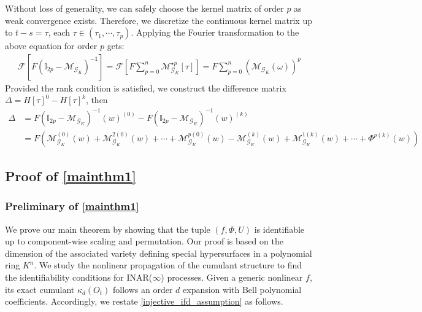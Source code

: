 \documentclass[10pt]{article}
\numberwithin{figure}{section}
\begin{document}
Without loss of generality, we can safely choose the kernel matrix of order $p$ as weak convergence exists. Therefore, we discretize the continuous kernel matrix up to $t-s=\tau$, each $\tau \in (\tau_1,\cdots,\tau_p)$. Applying the Fourier transformation to the above equation for order $p$ gets:
\begin{align}
    \mathcal{F}[F(\mathbb{I}_{2p}-\mathcal{M}_{\mathcal{G}_K})^{-1}]  = \mathcal{F}\left[ F\sum_{p=0}^{n}\mathcal{M}_{\mathcal{G}_K}^{\star p}[\tau]\right] =  F\sum_{p=0}^{n}\left(\mathcal{M}_{\mathcal{G}_K}(\omega)\right)^p
\end{align}
Provided the rank condition is satisfied, we construct the difference matrix $\Delta= H[\tau]^{0}-H[\tau]^{k}$, then
\begin{align*}
    \Delta &= F(\mathbb{I}_{2p} - \mathcal{M}_{\mathcal{G}_K})^{-1}(w)^{(0)}- F(\mathbb{I}_{2p} - \mathcal{M}_{\mathcal{G}_K})^{-1}(w)^{(k)}\\
    &= F(\mathcal{M}_{\mathcal{G}_K}^{(0)}(w)+\mathcal{M}_{\mathcal{G}_K}^{2(0)}(w)+\cdots + \mathcal{M}_{\mathcal{G}_K}^{p(0)}(w) - \mathcal{M}_{\mathcal{G}_K}^{(k)}(w)+\mathcal{M}_{\mathcal{G}_K}^{1(k)}(w)+\cdots + \Phi^{p(k)}(w))
\end{align*}

\subsection{Proof of \autoref{mainthm1}}\label{app:identifiability}

\subsubsection{Preliminary of \autoref{mainthm1} }

We prove our main theorem by showing that the tuple $(f,\Phi,U)$ is identifiable up to component-wise scaling and permutation. Our proof is based on the dimension of the associated variety defining special hypersurfaces in a polynomial ring $K^n$. We study the nonlinear propagation of the cumulant structure to find the identifiability conditions for INAR($\infty$) processes. Given a generic nonlinear $f$, its exact cumulant $\kappa_d(O_t)$ follows an order $d$ expansion with Bell polynomial coefficients. Accordingly, we restate \autoref{injective_ifd_assumption} as follows. 
\end{document}
